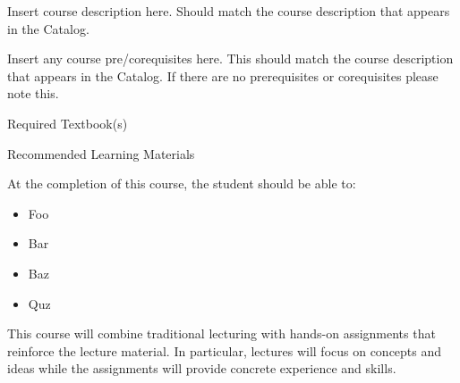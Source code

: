 \documentclass{wit_syllabus}
\author{Nate Derbinsky}
\date{Fall 2015}
\begin{document}
\maketitle

\begin{SyllabusHeader}
\instructor
{}
\end{SyllabusHeader}

Insert course description here.  Should match the course description that appears in the Catalog.

Insert any course pre/corequisites here.  This should match the course description that appears in the Catalog. If there are no prerequisites or corequisites please note this.

\begin{SyllabusBooks}{Required Textbook(s)}
\end{SyllabusBooks}

\SyllabusBookstore

\begin{SyllabusBooks}{Recommended Learning Materials}
\end{SyllabusBooks}


At the completion of this course, the student should be able to:
\begin{itemize}
\item Foo
\item Bar
\item Baz
\item Quz
\end{itemize}

This course will combine traditional lecturing with hands-on assignments that reinforce the lecture material.  
In particular, lectures will focus on concepts and ideas while the assignments will provide concrete experience and skills.
\end{document}
